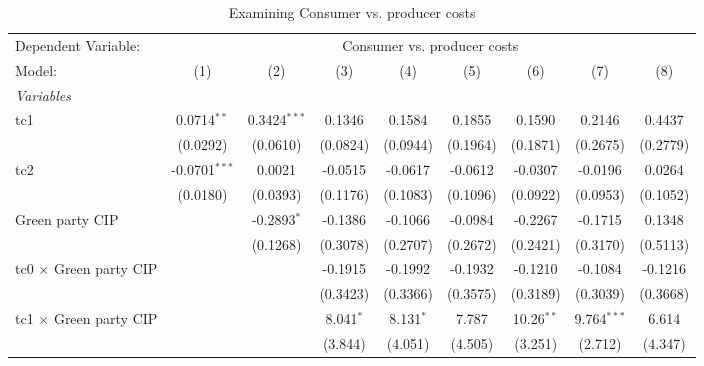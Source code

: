 
\begin{table}[htbp]
   \caption{Examining Consumer vs. producer costs}
   \centering
   \begin{tabular}{lcccccccc}
      \tabularnewline \midrule \midrule
      Dependent Variable: & \multicolumn{8}{c}{Consumer vs. producer costs}\\
      Model:                                  & (1)             & (2)            & (3)         & (4)         & (5)      & (6)          & (7)           & (8)\\  
      \midrule
      \emph{Variables}\\
      tc1                                     & 0.0714$^{**}$   & 0.3424$^{***}$ & 0.1346      & 0.1584      & 0.1855   & 0.1590       & 0.2146        & 0.4437\\   
                                              & (0.0292)        & (0.0610)       & (0.0824)    & (0.0944)    & (0.1964) & (0.1871)     & (0.2675)      & (0.2779)\\   
      tc2                                     & -0.0701$^{***}$ & 0.0021         & -0.0515     & -0.0617     & -0.0612  & -0.0307      & -0.0196       & 0.0264\\   
                                              & (0.0180)        & (0.0393)       & (0.1176)    & (0.1083)    & (0.1096) & (0.0922)     & (0.0953)      & (0.1052)\\   
      Green party CIP                         &                 & -0.2893$^{*}$  & -0.1386     & -0.1066     & -0.0984  & -0.2267      & -0.1715       & 0.1348\\   
                                              &                 & (0.1268)       & (0.3078)    & (0.2707)    & (0.2672) & (0.2421)     & (0.3170)      & (0.5113)\\   
      tc0 $\times$ Green party CIP            &                 &                & -0.1915     & -0.1992     & -0.1932  & -0.1210      & -0.1084       & -0.1216\\   
                                              &                 &                & (0.3423)    & (0.3366)    & (0.3575) & (0.3189)     & (0.3039)      & (0.3668)\\   
      tc1 $\times$ Green party CIP            &                 &                & 8.041$^{*}$ & 8.131$^{*}$ & 7.787    & 10.26$^{**}$ & 9.764$^{***}$ & 6.614\\   
                                              &                 &                & (3.844)     & (4.051)     & (4.505)  & (3.251)      & (2.712)       & (4.347)\\   

\end{tabular}
\end{table}
